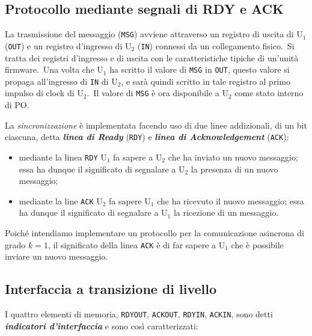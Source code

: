 \subsection{Protocollo mediante segnali di RDY e ACK}

La trasmissione del messaggio (\texttt{MSG}) avviene attraverso un registro di uscita di $\mathrm{U}_1$ (\texttt{OUT}) e un registro d'ingresso di $\mathrm{U}_2$ (\texttt{IN}) connessi da un collegamento fisico.\
Si tratta dei registri d'ingresso e di uscita con le caratteristiche tipiche di un'unità firmware.\
Una volta che $\mathrm{U}_1$ ha scritto il valore di \texttt{MSG} in \texttt{OUT}, questo valore si propaga all'ingresso di \texttt{IN} di $\mathrm{U}_2$, e sarà quindi scritto in tale registro al primo impulso di clock di $\mathrm{U}_2$.\
Il valore di \texttt{MSG} è ora disponibile a $\mathrm{U}_2$ come stato interno di PO.

La \textit{sincronizzazione} è implementata facendo uso di due linee addizionali, di un bit ciascuna, detta \textbf{\textit{linea di Ready}} (\texttt{RDY}) e \textbf{\textit{linea di Acknowledgement}} (\texttt{ACK}):

\begin{itemize}
    \item mediante la linea \texttt{RDY} $\mathrm{U}_1$ fa sapere a $\mathrm{U}_2$ che ha inviato un nuovo messaggio; essa ha dunque il significato di segnalare a $\mathrm{U}_2$ la presenza di un nuovo messaggio;
    \item mediante la line \texttt{ACK} $\mathrm{U}_2$ fa sapere $\mathrm{U}_1$ che ha ricevuto il nuovo messaggio; essa ha dunque il significato di segnalare a $\mathrm{U}_1$ la ricezione di un messaggio.
\end{itemize}

\noindent Poiché intendiamo implementare un protocollo per la comunicazione asincrona di grado $k = 1$, il significato della linea \texttt{ACK} è di far sapere a $\mathrm{U}_1$ che è possibile inviare un nuovo messaggio.

\subsection{Interfaccia a transizione di livello}

I quattro elementi di memoria, \texttt{RDYOUT}, \texttt{ACKOUT}, \texttt{RDYIN}, \texttt{ACKIN}, sono detti \textbf{\textit{indicatori d'interfaccia}} e sono così caratterizzati:

